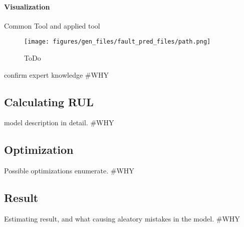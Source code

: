 		\paragraph{Visualization}
		Common Tool and applied tool
			\begin{figure}[!ht]
			\centering
			\texttt{[image: figures/gen\_files/fault\_pred\_files/path.png]}
			\caption{ToDo} 
			\end{figure}
		confirm expert knowledge
#WHY
	\subsection{Calculating RUL}
model description in detail.
#WHY
	\subsection{Optimization}
Possible optimizations enumerate.
#WHY
	\subsection{Result}
Estimating result, and what causing aleatory mistakes in the model. 
#WHY
\cite{GitHub_FP_RUL}